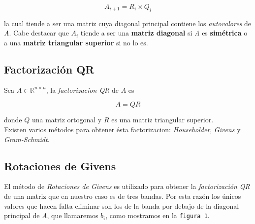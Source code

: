 \documentclass[a4paper]{article}
\begin{document}
$$A_{i + 1} = R_i \times Q_i$$

la cual tiende a ser una matriz cuya diagonal principal contiene los \textit{autovalores} de \textit{A}. Cabe destacar que $A_i$ tiende a ser una \textbf{matriz diagonal} si \textit{A} es \textbf{simétrica} o a una \textbf{matriz triangular superior} si no lo es.\\

\subsection{Factorización QR}

Sea $A\in\mathbb{R}^{n\times n}$, la \textit{factorizacion QR} de $A$ es 

$$A = QR$$ 

donde $Q$ una matriz ortogonal y $R$ es una matriz triangular superior.\\

Existen varios métodos para obtener ésta factorizacion: \textit{Householder}, \textit{Givens} y \textit{Gram-Schmidt}.
 

\subsection{Rotaciones de Givens}

El método de \textit{Rotaciones de Givens} es utilizado para obtener la \textit{factorización QR} de una matriz que en nuestro caso es de tres bandas. Por esta razón los únicos valores que hacen falta eliminar son los de la banda por debajo de la diagonal principal de \textit{A}, que llamaremos $b_i$, como mostramos en la \texttt{figura 1}.
\end{document}
